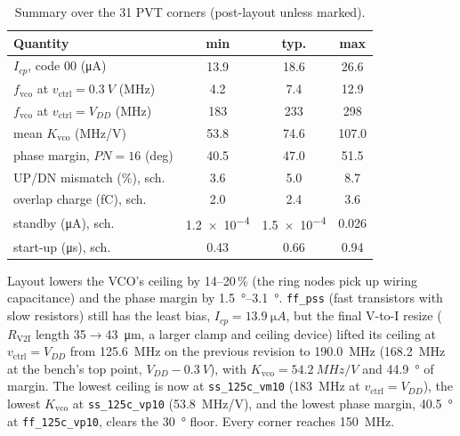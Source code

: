 \documentclass[10pt,twocolumn,letterpaper]{article}
\newcommand{\code}[1]{\texttt{\small #1}}
\begin{document}
\begin{table}[t]
\centering
\caption{Summary over the 31 PVT corners (post-layout unless marked).}
\label{tab:summary}
\small
\setlength\tabcolsep{4pt}
\begin{tabular}{@{}lccc@{}}
\toprule
Quantity & min & typ. & max \\
\midrule
$I_{cp}$, code 00 (\si{\micro A}) & 13.9 & 18.6 & 26.6 \\
$f_\text{vco}$ at $v_\text{ctrl}=\SI{0.3}{V}$ (MHz) & 4.2 & 7.4 & 12.9 \\
$f_\text{vco}$ at $v_\text{ctrl}=V_{DD}$ (MHz) & 183 & 233 & 298 \\
mean $K_\text{vco}$ (MHz/V) & 53.8 & 74.6 & 107.0 \\
phase margin, $PN=16$ (deg) & 40.5 & 47.0 & 51.5 \\
UP/DN mismatch (\%), sch. & 3.6 & 5.0 & 8.7 \\
overlap charge (fC), sch. & 2.0 & 2.4 & 3.6 \\
standby (\si{\micro A}), sch. & \num{1.2e-4} & \num{1.5e-4} & 0.026 \\
start-up (\si{\micro s}), sch. & 0.43 & 0.66 & 0.94 \\
\bottomrule
\end{tabular}
\end{table}

Layout lowers the VCO's ceiling by 14--20\,\% (the ring nodes pick up wiring
capacitance) and the phase margin by \SIrange{1.5}{3.1}{\degree}.
\code{ff\_pss} (fast transistors with slow resistors) still has the least
bias, $I_{cp}=\SI{13.9}{\micro A}$, but the final V-to-I resize
($R_\text{V2I}$ length \SI{35}{}$\to$\SI{43}{\micro m}, a larger clamp and
ceiling device) lifted its ceiling at $v_\text{ctrl}=V_{DD}$ from
\SI{125.6}{MHz} on the previous revision to \SI{190.0}{MHz} (\SI{168.2}{MHz}
at the bench's top point, $V_{DD}-\SI{0.3}{V}$), with
$K_\text{vco}=\SI{54.2}{MHz/V}$ and
\SI{44.9}{\degree} of margin. The lowest ceiling is now at
\code{ss\_125c\_vm10} (\SI{183}{MHz} at $v_\text{ctrl}=V_{DD}$), the lowest
$K_\text{vco}$ at \code{ss\_125c\_vp10} (\SI{53.8}{MHz/V}), and the lowest
phase margin, \SI{40.5}{\degree} at \code{ff\_125c\_vp10}, clears the
\SI{30}{\degree} floor. Every corner reaches \SI{150}{MHz}.
\end{document}
